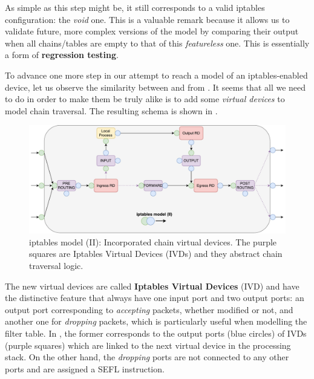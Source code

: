 As simple as this step might be, it still corresponds to a valid iptables
configuration: the \emph{void} one.  This is a valuable remark because it
allows us to validate future, more complex versions of the model by comparing
their output when all chains/tables are empty to that of this
\emph{featureless} one.  This is essentially a form of \textbf{regression
testing}.

\bigskip

To advance one more step in our attempt to reach a model of an iptables-enabled
device, let us observe the similarity between
 and
 from
.  It seems that all we need to do
in order to make them be truly alike is to add some \emph{virtual devices} to
model chain traversal. The resulting schema is shown in
.

\begin{figure}[h]
  \centering
  \captionsetup{justification=centering}
  \includegraphics[scale=0.45]{assets/img/iptables-2}
  \caption[iptables model (II): Incorporated chain virtual devices.]{iptables
  model (II): Incorporated chain virtual devices.  The purple squares are
  Iptables Virtual Devices (IVDs) and they abstract chain traversal logic.}
  \label{fig:iptables-2}
\end{figure}

The new virtual devices are called \textbf{Iptables Virtual Devices}
(IVD) and have the distinctive feature
that always have one input port and two output ports: an output port
corresponding to \emph{accepting} packets, whether modified or not, and another
one for \emph{dropping} packets, which is particularly useful when modelling
the filter table.  In , the former
corresponds to the output ports (blue circles) of IVDs (purple squares) which
are linked to the next virtual device in the processing stack.  On the other
hand, the \emph{dropping} ports are not connected to any other ports and are
assigned a SEFL  instruction.


